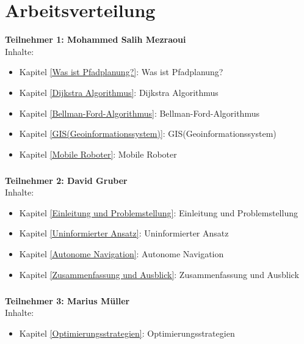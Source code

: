 \chapter*{Arbeitsverteilung}

\textbf{Teilnehmer 1: Mohammed Salih Mezraoui} 
\\
 Inhalte:
 \begin{itemize}
    \item Kapitel \ref{Was ist Pfadplanung?}: Was ist Pfadplanung?
    \item Kapitel \ref{Dijkstra Algorithmus}: Dijkstra Algorithmus
    \item Kapitel \ref{Bellman-Ford-Algorithmus}: Bellman-Ford-Algorithmus
    \item Kapitel \ref{GIS(Geoinformationssystem)}: GIS(Geoinformationssystem)
    \item Kapitel \ref{Mobile Roboter}: Mobile Roboter
\end{itemize}
\paragraph*{}
\textbf{Teilnehmer 2: David Gruber} 
\\
Inhalte: 
\begin{itemize}
    \item Kapitel \ref{Einleitung und Problemstellung}: Einleitung und Problemstellung
    \item Kapitel \ref{Uninformierter Ansatz}: Uninformierter Ansatz
    \item Kapitel \ref{Autonome Navigation}: Autonome Navigation
    \item Kapitel \ref{Zusammenfassung und Ausblick}: Zusammenfassung und Ausblick
\end{itemize}
\paragraph*{}
\textbf{Teilnehmer 3: Marius Müller} 
\\
 Inhalte: 
\begin{itemize}
	\item Kapitel \ref{Optimierungsstrategien}: Optimierungsstrategien
\end{itemize}